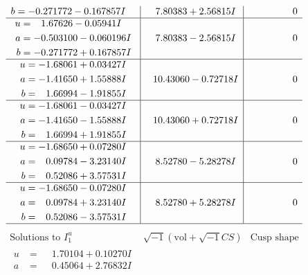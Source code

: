 \documentclass[1p]{elsarticle_modified}
\theoremstyle{definition}
\newcommand{\I}{\sqrt{-1}}
\begin{document}
$$\begin{array}{c|c|c}
\begin{aligned}
b &= -0.271772 - 0.167857 I\end{aligned}
 & \phantom{-}7.80383 + 2.56815 I & \phantom{-0.000000 } 0 \\ \hline\begin{aligned}
u &= \phantom{-}1.67626 - 0.05941 I \\
a &= -0.503100 - 0.060196 I \\
b &= -0.271772 + 0.167857 I\end{aligned}
 & \phantom{-}7.80383 - 2.56815 I & \phantom{-0.000000 } 0 \\ \hline\begin{aligned}
u &= -1.68061 + 0.03427 I \\
a &= -1.41650 + 1.55888 I \\
b &= \phantom{-}1.66994 - 1.91855 I\end{aligned}
 & \phantom{-}10.43060 - 0.72718 I & \phantom{-0.000000 } 0 \\ \hline\begin{aligned}
u &= -1.68061 - 0.03427 I \\
a &= -1.41650 - 1.55888 I \\
b &= \phantom{-}1.66994 + 1.91855 I\end{aligned}
 & \phantom{-}10.43060 + 0.72718 I & \phantom{-0.000000 } 0 \\ \hline\begin{aligned}
u &= -1.68650 + 0.07280 I \\
a &= \phantom{-}0.09784 - 3.23140 I \\
b &= \phantom{-}0.52086 + 3.57531 I\end{aligned}
 & \phantom{-}8.52780 - 5.28278 I & \phantom{-0.000000 } 0 \\ \hline\begin{aligned}
u &= -1.68650 - 0.07280 I \\
a &= \phantom{-}0.09784 + 3.23140 I \\
b &= \phantom{-}0.52086 - 3.57531 I\end{aligned}
 & \phantom{-}8.52780 + 5.28278 I & \phantom{-0.000000 } 0\\
 \hline 
 \end{array}$$\newpage$$\begin{array}{c|c|c}  
\text{Solutions to }I^u_{1}& \I (\text{vol} + \sqrt{-1}CS) & \text{Cusp shape}\\
 \hline 
\begin{aligned}
u &= \phantom{-}1.70104 + 0.10270 I \\
a &= \phantom{-}0.45064 + 2.76832 I \\

\end{aligned}
\end{array}$$
\end{document}
